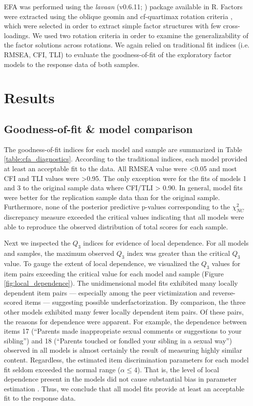 \documentclass[letterpaper,man,natbib,floatsintext,longtable]{apa6}
\begin{document}
EFA was performed using the \textit{lavaan} (v0.6.11; \citealt{lavaan}) package available in R. Factors were extracted using the oblique geomin \citep{yates1987multivariate} and cf-quartimax rotation criteria \citep{crawford1970general}, which were selected in order to extract simple factor structures with few cross-loadings. We used two rotation criteria in order to examine the generalizability of the factor solutions across rotations. We again relied on traditional fit indices (i.e. RMSEA, CFI, TLI) to evaluate the goodness-of-fit of the exploratory factor models to the response data of both samples.

\section{Results}

\subsection{Goodness-of-fit \& model comparison}

The goodness-of-fit indices for each model and sample are summarized in Table \ref{table:cfa_diagnostics}. According to the traditional indices, each model provided at least an acceptable fit to the data. All RMSEA value were <0.05 and most CFI and TLI values were >0.95. The only exception were for the fits of models 1 and 3 to the original sample data where CFI/TLI > 0.90. In general, model fits were better for the replication sample data than for the original sample. Furthermore, none of the posterior predictive p-values corresponding to the $\chi^2_{NC}$ discrepancy measure exceeded the critical values indicating that all models were able to reproduce the observed distribution of total scores for each sample.

Next we inspected the $Q_3$ indices for evidence of local dependence. For all models and samples, the maximum observed $Q_3$ index was greater than the critical $Q_3$ value. To gauge the extent of local dependence, we visualized the $Q_3$ values for item pairs exceeding the critical value for each model and sample (Figure \ref{fig:local_dependence}). The unidimensional model fits exhibited many locally dependent item pairs --- especially among the peer victimization and reverse-scored items --- suggesting possible underfactorization. By comparison, the three other models exhibited many fewer locally dependent item pairs. Of these pairs, the reasons for dependence were apparent. For example, the dependence between items 17 (``Parents made inappropriate sexual comments or suggestions to your sibling'') and 18 (``Parents touched or fondled your sibling in a sexual way'') observed in all models is almost certainly the result of measuring highly similar content. Regardless, the estimated item discrimination parameters for each model fit seldom exceeded the normal range ($\alpha \leq 4$). That is, the level of local dependence present in the models did not cause substantial bias in parameter estimation \citep{edwards2018diagnostic}. Thus, we conclude that all model fits provide at least an acceptable fit to the response data.
\end{document}

